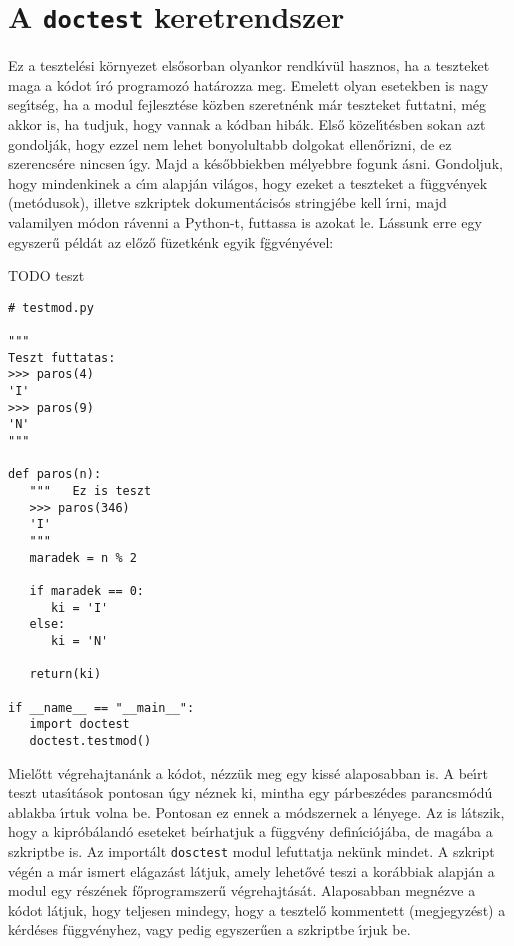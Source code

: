 \appendix
\section{A {\tt doctest} keretrendszer}

Ez a tesztel\'esi k\"ornyezet els\H{o}sorban olyankor rendk\'{\i}v\"ul hasznos, ha a teszteket maga a 
k\'odot \'{\i}r\'o programoz\'o hat\'arozza meg. Emelett olyan esetekben is nagy seg\'{\i}ts\'eg, ha a 
modul fejleszt\'ese k\"ozben szeretn\'enk m\'ar teszteket futtatni, m\'eg akkor is, ha tudjuk, hogy vannak 
a k\'odban hib\'ak. Els\H{o} k\"ozel\'{\i}t\'esben sokan azt gondolj\'ak, hogy ezzel nem lehet bonyolultabb 
dolgokat ellen\H{o}rizni, de ez szerencs\'ere nincsen \'{\i}gy. Majd a k\'es\H{o}bbiekben m\'elyebbre fogunk 
\'asni. Gondoljuk, hogy mindenkinek a c\'{\i}m alapj\'an vil\'agos, hogy ezeket a teszteket a f\"uggv\'enyek 
(met\'odusok), illetve szkriptek  dokument\'acis\'os stringj\'ebe kell \'{\i}rni, majd valamilyen m\'odon 
r\'avenni a Python-t, futtassa is azokat le. L\'assunk erre egy egyszer\H{u} p\'eld\'at az el\H{o}z\H{o} 
f\"uzetk\'enk egyik f\"ggv\'eny\'evel:

TODO   teszt 

\begin{Verbatim}[fontsize=\small]
# testmod.py

"""
Teszt futtatas:
>>> paros(4)
'I'
>>> paros(9)
'N'
"""

def paros(n):
   """   Ez is teszt
   >>> paros(346)
   'I'
   """
   maradek = n % 2

   if maradek == 0:
      ki = 'I'
   else:
      ki = 'N'

   return(ki)

if __name__ == "__main__":
   import doctest
   doctest.testmod()

\end{Verbatim}

\noindent Miel\H{o}tt v\'egrehajtan\'ank a k\'odot, n\'ezz\"uk meg egy kiss\'e alaposabban is. A be\'{\i}rt 
teszt utas\'{\i}t\'asok pontosan \'ugy n\'eznek ki, mintha egy p\'arbesz\'edes parancsm\'od\'u ablakba \'{\i}rtuk 
volna be. Pontosan ez ennek a m\'odszernek a l\'enyege. Az is l\'atszik, hogy a kipr\'ob\'aland\'o eseteket 
be\'{\i}rhatjuk a f\"uggv\'eny defin\'{\i}ci\'oj\'aba, de mag\'aba a szkriptbe is. Az import\'alt {\tt dosctest} 
modul lefuttatja nek\"unk mindet. A szkript v\'eg\'en a m\'ar ismert el\'agaz\'ast l\'atjuk, amely lehet\H{o}v\'e 
teszi a kor\'abbiak alapj\'an a modul egy r\'esz\'enek f\H{o}programszer\H{u} v\'egrehajt\'as\'at. Alaposabban 
megn\'ezve a k\'odot l\'atjuk, hogy teljesen mindegy, hogy a tesztel\H{o} kommentett (megjegyz\'est) a 
k\'erd\'eses f\"uggv\'enyhez, vagy pedig egyszer\H{u}en a szkriptbe \'{\i}rjuk be.

